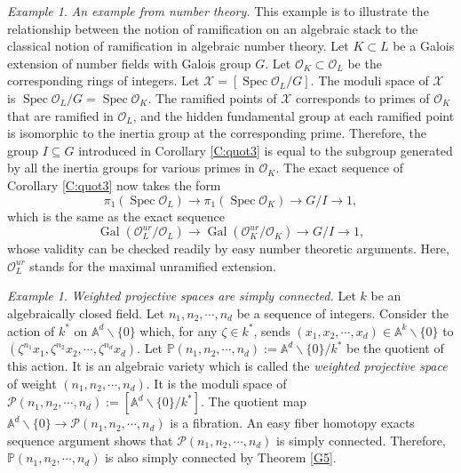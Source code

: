 \documentclass{amsart}
\theoremstyle{definition}
\theoremstyle{remark}
\theoremstyle{remark}
\newtheorem{ex}[thm]{Example}
\newcommand{\X}{\mathcal{X}}
\newcommand{\Spec}{\operatorname{Spec}}
\newcommand{\Gal}{\operatorname{Gal}}
\begin{document}
\begin{ex}{\em An example from number theory.}
This example is  to illustrate the relationship between the notion
of ramification on an algebraic stack to the classical notion of
ramification in algebraic number theory. Let $K \subset L$ be a
Galois extension of number fields with Galois group $G$. Let
$\mathcal{O}_K \subset \mathcal{O}_L$ be the corresponding rings
of integers. Let $\X=[\Spec \mathcal{O}_L/G]$. The moduli space of
$\X$ is $\Spec \mathcal{O}_L/G=\Spec \mathcal{O}_K$. The ramified
points of $\X$ corresponds to  primes of $\mathcal{O}_K$ that are
ramified in $\mathcal{O}_L$, and the hidden fundamental group at
each ramified point is isomorphic to the inertia group at the
corresponding prime. Therefore, the group $I \subseteq G$
introduced in Corollary \ref{C:quot3} is equal to the subgroup
generated by all the inertia groups for various primes in
$\mathcal{O}_K$. The exact sequence of Corollary \ref{C:quot3} now
takes the form $$\pi_1(\Spec \mathcal{O}_L) \to \pi_1(\Spec
\mathcal{O}_K) \to G/I \to 1,$$ \noindent which is the same as the
exact sequence $$\Gal(\mathcal{O}_L^{ur}/\mathcal{O}_L) \to
\Gal(\mathcal{O}_K^{ur}/\mathcal{O}_K) \to G/I \to 1,$$ \noindent
whose validity can be checked readily by easy number theoretic
arguments. Here, $\mathcal{O}_L^{ur}$ stands for the maximal
unramified extension.
\end{ex}

\begin{ex}{\label{E:proj}}{\sl Weighted projective spaces are
simply connected.} Let $k$ be an algebraically closed field. Let
$n_1,n_2,\cdots,n_d$ be a sequence of integers. Consider the
action of $k^*$ on $\mathbb{A}^{d}\backslash\{0\}$ which, for any
$\zeta \in k^*$, sends $(x_1,x_2,\cdots,x_d) \in
\mathbb{A}^{k}\backslash\{0\}$ to
$(\zeta^{n_1}x_1,\zeta^{n_2}x_2,\cdots,\zeta^{n_d}x_d)$. Let
$\mathbb{P}(n_1,n_2,\cdots,n_d):=\mathbb{A}^{d}\backslash\{0\}/{k^*}$
be the quotient of this action. It is an algebraic variety   which
is called the {\sl weighted projective space} of weight
$(n_1,n_2,\cdots,n_d)$. It is the moduli space of
$\mathcal{P}(n_1,n_2,\cdots,n_d):=[\mathbb{A}^{d}\backslash\{0\}/{k^*}]$.
The quotient map $\mathbb{A}^{d}\backslash\{0\} \to
\mathcal{P}(n_1,n_2,\cdots,n_d)$ is a fibration. An easy fiber
homotopy exacts sequence argument shows that
$\mathcal{P}(n_1,n_2,\cdots,n_d)$ is simply connected. Therefore,
$\mathbb{P}(n_1,n_2,\cdots,n_d)$ is also simply connected by
Theorem \ref{G5}. \end{ex}
\end{document}
